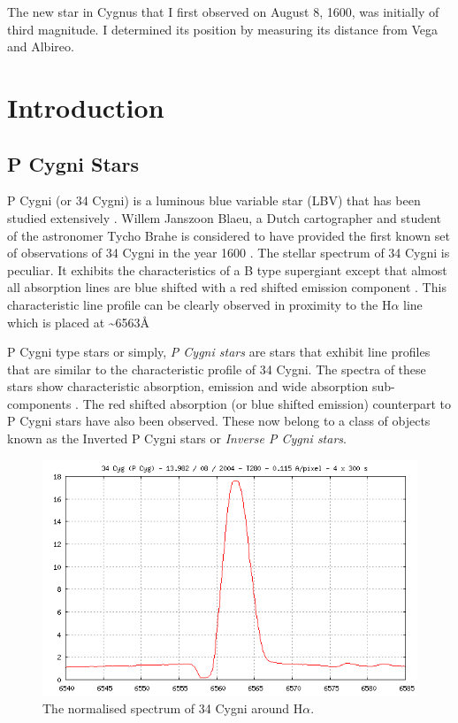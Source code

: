 \begin{savequote}[45mm]
The new star in Cygnus that I first observed on August 8, 1600, was initially of third magnitude. I determined its position by measuring its distance from Vega and Albireo.
\end{savequote}

\chapter{Introduction}

\section{P Cygni Stars}

P Cygni (or 34 Cygni) is a luminous blue variable star (LBV) that has been studied extensively \cite{1953PDAO....9....1B, hutchings1969expanding, elliott20225, underhill1966supergiants,mizumoto2018newly}. Willem Janszoon Blaeu, a Dutch cartographer and student of the astronomer Tycho Brahe is considered to have provided the first known set of observations of 34 Cygni in the year 1600 \cite{deGrootPCygni}. The stellar spectrum of 34 Cygni is peculiar. It exhibits the characteristics of a B type supergiant except that almost all absorption lines are blue shifted with a red shifted emission component \cite{hutchings1969expanding}. This characteristic line profile can be clearly observed in proximity to the H$\alpha$ line which is placed at \textasciitilde 6563\r{A} \cite{zhang2021catalog,traven2015gaia}

P Cygni type stars or simply, \emph{P Cygni stars} are stars that exhibit line profiles that are similar to the characteristic profile of 34 Cygni. The spectra of these stars show characteristic absorption, emission and wide absorption sub-components \cite{zhang2021catalog}. The red shifted absorption (or blue shifted emission) counterpart to P Cygni stars have also been observed. These now belong to a class of objects known as the Inverted P Cygni stars or \emph{Inverse P Cygni stars}. 

\begin{figure}[t]
\centering
\includegraphics[scale=.40]{figures/34cygni.png}
\caption{The normalised spectrum of 34 Cygni around H$\alpha$.}
\end{figure}


